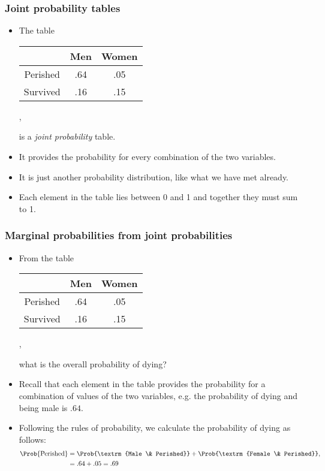 \documentclass[10pt,xcolor=dvipsnames,serif,professionalfont]{beamer} %
\begin{document}
\begin{frame}
\frametitle{Joint probability tables}
\begin{itemize}
\item The table
\begin{center}
\begin{tabular}{c|cc}
& Men & Women \\\hline
Perished & .64 & .05 \\
Survived & .16 & .15 \\
\end{tabular},
\end{center}
is a \emph{joint probability} table.
\item It provides the probability for every combination of the two variables. 
\item It is just another probability distribution, like what we have met already.
\item Each element in the table lies between 0 and 1 and together they must sum to 1.
\end{itemize}
\end{frame}

\begin{frame}
\frametitle{Marginal probabilities from joint probabilities}
\begin{itemize}
\item From the table
{\scriptsize
\begin{center}
\begin{tabular}{c|cc}
& Men & Women \\\hline
Perished & .64 & .05 \\
Survived & .16 & .15 \\
\end{tabular},
\end{center}
}
what is the overall probability of dying?
\item Recall that each element in the table provides the probability for a combination of values of the two variables, e.g. the probability of dying and being male is $.64$.
\item Following the rules of probability, we calculate the probability of dying as follows:
\begin{align}
\Prob{\textrm{Perished}} &= \Prob{\textrm{Male \& Perished}} + \Prob{\textrm{Female \& Perished}},\\
&= .64 + .05 = .69
\end{align}
\end{itemize}
\end{frame}
\end{document}
